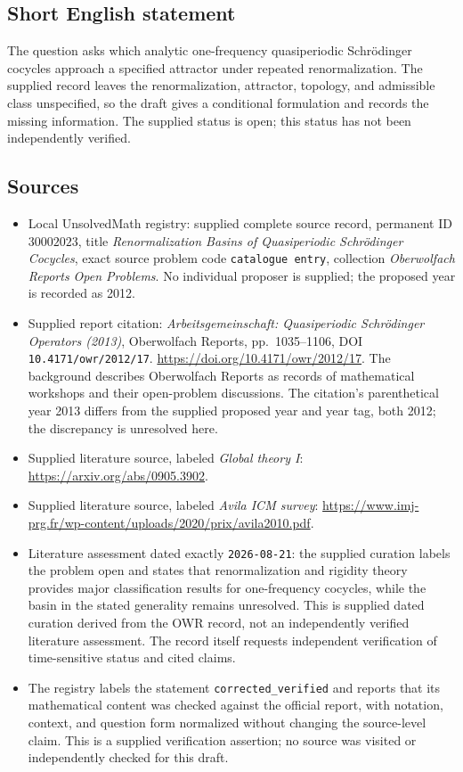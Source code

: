 \documentclass[11pt]{article}
\begin{document}
\subsection{Short English statement}
The question asks which analytic one-frequency quasiperiodic Schr\"odinger cocycles approach a specified attractor under repeated renormalization. The supplied record leaves the renormalization, attractor, topology, and admissible class unspecified, so the draft gives a conditional formulation and records the missing information. The supplied status is open; this status has not been independently verified.
\subsection{Sources}
\begin{itemize}
\item Local UnsolvedMath registry: supplied complete source record, permanent ID \(30002023\), title \emph{Renormalization Basins of Quasiperiodic Schr\"odinger Cocycles}, exact source problem code \texttt{catalogue entry}, collection \emph{Oberwolfach Reports Open Problems}. No individual proposer is supplied; the proposed year is recorded as 2012.
\item Supplied report citation: \emph{Arbeitsgemeinschaft: Quasiperiodic Schr\"odinger Operators (2013)}, Oberwolfach Reports, pp.\ 1035--1106, DOI \texttt{10.4171/owr/2012/17}. \url{https://doi.org/10.4171/owr/2012/17}. The background describes Oberwolfach Reports as records of mathematical workshops and their open-problem discussions. The citation's parenthetical year 2013 differs from the supplied proposed year and year tag, both 2012; the discrepancy is unresolved here.
\item Supplied literature source, labeled \emph{Global theory I}: \url{https://arxiv.org/abs/0905.3902}.
\item Supplied literature source, labeled \emph{Avila ICM survey}: \url{https://www.imj-prg.fr/wp-content/uploads/2020/prix/avila2010.pdf}.
\item Literature assessment dated exactly \texttt{2026-08-21}: the supplied curation labels the problem open and states that renormalization and rigidity theory provides major classification results for one-frequency cocycles, while the basin in the stated generality remains unresolved. This is supplied dated curation derived from the OWR record, not an independently verified literature assessment. The record itself requests independent verification of time-sensitive status and cited claims.
\item The registry labels the statement \texttt{corrected\_verified} and reports that its mathematical content was checked against the official report, with notation, context, and question form normalized without changing the source-level claim. This is a supplied verification assertion; no source was visited or independently checked for this draft.
\end{itemize}
\end{document}
